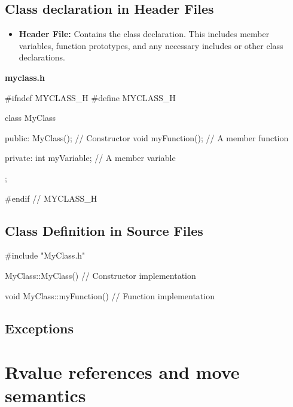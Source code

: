 \documentclass{report}
\begin{document}
    \subsection{Class declaration in Header Files}
    \bigbreak \noindent 
    \begin{itemize}
        \item \textbf{Header File:} Contains the class declaration. This includes member variables, function prototypes, and any necessary includes or other class declarations.
    \end{itemize}
    \bigbreak \noindent 
    \textbf{myclass.h}
    \bigbreak \noindent 
    \begin{cppcode}
#ifndef MYCLASS_H
#define MYCLASS_H

class MyClass {
public:
    MyClass(); // Constructor
    void myFunction(); // A member function

private:
    int myVariable; // A member variable
};

#endif // MYCLASS_H
    \end{cppcode}

    \bigbreak \noindent 
    \subsection{Class Definition in Source Files}
    \bigbreak \noindent 
    \begin{cppcode}
#include "MyClass.h"

MyClass::MyClass() {
    // Constructor implementation
}

void MyClass::myFunction() {
    // Function implementation
}
    \end{cppcode}

    \pagebreak \bigbreak \noindent 
    \subsection{Exceptions}
    \bigbreak \noindent 


    \pagebreak \bigbreak \noindent 
    \section{\LARGE Rvalue references and move semantics}
    \bigbreak \noindent 
    \begin{concept}
        
    \end{concept}
    

    \pagebreak \bigbreak \noindent 
\end{document}
